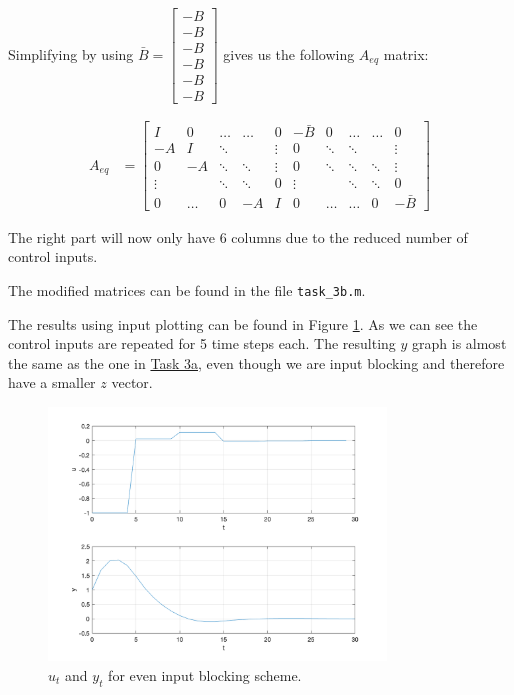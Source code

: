 \documentclass[11pt, a4paper, english]{NTNUoving}
\begin{document}
\begin{oppgave}
\begin{punkt}
        Simplifying by using $\bar{B} = \begin{bmatrix}
            -B \\
            -B \\
            -B \\
            -B \\
            -B \\
            -B
        \end{bmatrix}$ gives us the following $A_{eq}$ matrix:

        \begin{align*}
            A_{eq} &= \begin{bmatrix}
                I & 0 & \dots &  \dots & 0 & -\bar{B} & 0 & \dots & \dots & 0 \\
                -A & I & \ddots &  & \vdots & 0 & \ddots & \ddots & & \vdots \\
                0 & -A & \ddots & \ddots & \vdots & 0 & \ddots & \ddots & \ddots & \vdots \\
                \vdots &  & \ddots & \ddots & 0 & \vdots &  & \ddots & \ddots & 0 \\
                0 & \dots & 0 & -A & I & 0 & \dots & \dots & 0 & -\bar{B}
            \end{bmatrix}
        \end{align*}

        The right part will now only have 6 columns due to the reduced number of control inputs.

        The modified matrices can be found in the file \texttt{task\_3b.m}.

        The results using input plotting can be found in Figure \ref{fig:3b}. As we can see the control inputs
        are repeated for 5 time steps each. The resulting $y$ graph is almost the same as the one in \hyperref[3a]{Task 3a}, even
        though we are input blocking and therefore have a smaller $z$ vector.


        \begin{figure}[H]
            \centering
            \includegraphics[width=0.8\textwidth]{../3b.png}
            \caption{$u_t$ and $y_t$ for even input blocking scheme.}
            \label{fig:3b}
        \end{figure}


\end{punkt}
\end{oppgave}
\end{document}
